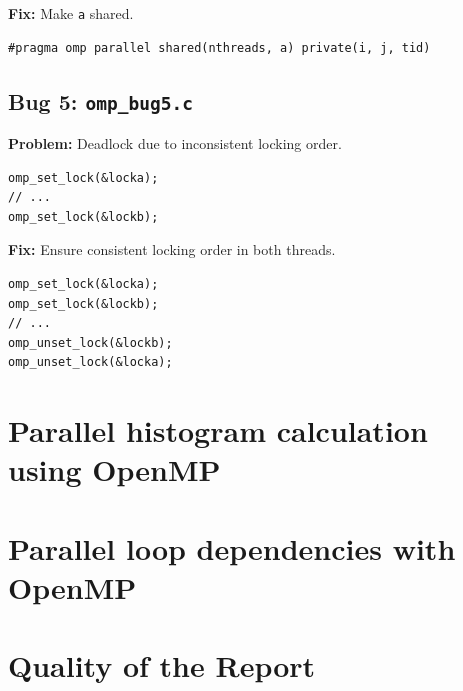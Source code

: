 \documentclass[unicode,11pt,a4paper,oneside,numbers=endperiod,openany]{scrartcl}
\begin{document}
\textbf{Fix:} Make \texttt{a} shared.

\begin{lstlisting}[caption=Corrected Code]
#pragma omp parallel shared(nthreads, a) private(i, j, tid)
\end{lstlisting}

\subsection{Bug 5: \texttt{omp\_bug5.c}}

\textbf{Problem:} Deadlock due to inconsistent locking order.

\begin{lstlisting}[caption=Buggy Code]
omp_set_lock(&locka);
// ...
omp_set_lock(&lockb);
\end{lstlisting}

\textbf{Fix:} Ensure consistent locking order in both threads.

\begin{lstlisting}[caption=Corrected Code]
omp_set_lock(&locka);
omp_set_lock(&lockb);
// ...
omp_unset_lock(&lockb);
omp_unset_lock(&locka);
\end{lstlisting}

\newpage
\section{Parallel histogram calculation using OpenMP }


\newpage
\section{Parallel loop dependencies with OpenMP }


\newpage
\section{Quality of the Report }
\end{document}
